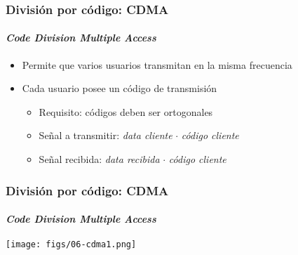 \documentclass[letter]{beamer}
\begin{document}
\begin{frame}
  \frametitle{División por código: CDMA}
  \framesubtitle{{\em Code Division Multiple Access}}

  \begin{itemize}
    \item Permite que varios usuarios transmitan en la misma frecuencia
    \item Cada usuario posee un código de transmisión
      \begin{itemize}
        \item Requisito: códigos deben ser ortogonales
        \item Señal a transmitir: {\em data cliente} $ \cdot $ {\em código cliente}
        \item Señal recibida: {\em data recibida} $ \cdot $ {\em código cliente}
      \end{itemize}
  \end{itemize}

\end{frame}

\begin{frame}
  \frametitle{División por código: CDMA}
  \framesubtitle{{\em Code Division Multiple Access}}

  \begin{center}
    \texttt{[image: figs/06-cdma1.png]}
  \end{center}

\end{frame}
\end{document}
